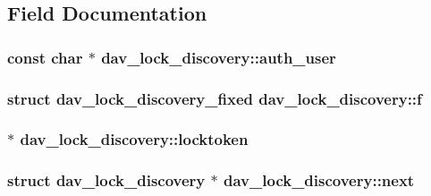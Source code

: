 \subsection{Field Documentation}
\subsubsection[{\texorpdfstring{auth\+\_\+user}{auth_user}}]{\setlength{\rightskip}{0pt plus 5cm}const char $\ast$ dav\+\_\+lock\+\_\+discovery\+::auth\+\_\+user}\hypertarget{structdav__lock__discovery_a737faeec78dac66af3c6fa8503fc6f3b}{}\label{structdav__lock__discovery_a737faeec78dac66af3c6fa8503fc6f3b}
\subsubsection[{\texorpdfstring{f}{f}}]{\setlength{\rightskip}{0pt plus 5cm}struct {\bf dav\+\_\+lock\+\_\+discovery\+\_\+fixed} dav\+\_\+lock\+\_\+discovery\+::f}\hypertarget{structdav__lock__discovery_ab52935f2bf70c231c596ad520a1161f4}{}\label{structdav__lock__discovery_ab52935f2bf70c231c596ad520a1161f4}
\subsubsection[{\texorpdfstring{locktoken}{locktoken}}]{ $\ast$ dav\+\_\+lock\+\_\+discovery\+::locktoken}\hypertarget{structdav__lock__discovery_adcbb35d9d5cb4018fa9815566a9aa44e}{}\label{structdav__lock__discovery_adcbb35d9d5cb4018fa9815566a9aa44e}
\subsubsection[{\texorpdfstring{next}{next}}]{\setlength{\rightskip}{0pt plus 5cm}struct {\bf dav\+\_\+lock\+\_\+discovery} $\ast$ dav\+\_\+lock\+\_\+discovery\+::next}\hypertarget{structdav__lock__discovery_a5ce249ebf865d7f7abd6e03a4b58e33d}{}\label{structdav__lock__discovery_a5ce249ebf865d7f7abd6e03a4b58e33d}
